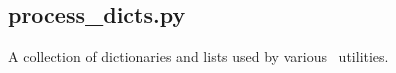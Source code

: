 
\subsection{process\_dicts.py}

A collection of dictionaries and lists used by various \process\ utilities.

